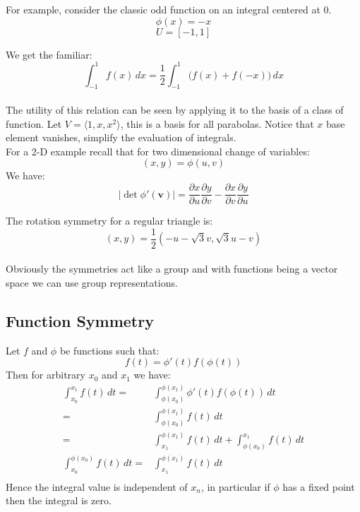 For example, consider the classic odd function on an integral centered at $0$.
\[\phi(x) = -x \]
\[U = [-1,1]\]

We get the familiar:
\[\int_{-1}^{1}f(x)\,dx = \frac{1}{2}\int_{-1}^{1}\big(f(x)+f(-x)\big)\,dx\]
\\

The utility of this relation can be seen by applying it to the basis of a class of function.
Let $V = \langle 1,x,x^2 \rangle$, this is a basis for all parabolas.
Notice that $x$ base element vanishes, simplify the evaluation of integrals.
\\

For a 2-D example recall that for two dimensional change of variables:
\[ (x,y) = \phi(u,v) \]
We have:
\[|\det\phi'(\mathbf{v})| = \frac{\partial x}{\partial u}\frac{\partial y}{\partial v} - \frac{\partial x}{\partial v}\frac{\partial y}{\partial u} \]

The rotation symmetry for a regular triangle is:
\[(x,y) = \frac{1}{2}(-u-\sqrt{3}v,\sqrt{3}u-v)\]
\\

Obviously the symmetries act like a group and with functions being a vector space we can use group representations.

\subsection{Function Symmetry}
Let $f$ and $\phi$ be functions such that:
\[f(t) = \phi'(t)f(\phi(t))\]
Then for arbitrary $x_0$ and $x_1$ we have:
\begin{equation*}
\begin{aligned}
	\int^{x_1}_{x_0}f(t)\,dt =& \int^{\phi(x_1)}_{\phi(x_0)}\phi'(t)f(\phi(t))\,dt \\ 
	=& \int^{\phi(x_1)}_{\phi(x_0)}f(t)\,dt \\ 
	=& \int^{\phi(x_1)}_{x_1}f(t)\,dt+\int_{\phi(x_0)}^{x_1}f(t)\,dt \\ 
	\int^{\phi(x_0)}_{x_0}f(t)\,dt =& \int^{\phi(x_1)}_{x_1}f(t)\,dt \\ 
\end{aligned}
\end{equation*}
Hence the integral value is independent of $x_n$, in particular if $\phi$ has a fixed point then the integral is zero.
